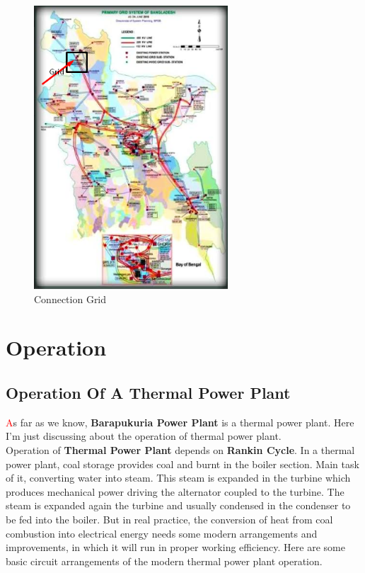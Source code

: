 \documentclass[11 pt]{article}
\begin{document}
\begin{figure}[h!]
\centering
\includegraphics[width=\textwidth-110pt, height=300pt]{Gallery/Grid.png}
\caption{Connection Grid}
\end{figure}

\pagebreak

\section{Operation}
\subsection{Operation Of A Thermal Power Plant}
{\huge\textcolor{red}{\hspace{5 mm}A}}s far as we know, \textbf{Barapukuria Power Plant} is a thermal power plant. Here I'm just discussing about the operation of thermal power plant.\\
Operation of \textbf{Thermal Power Plant} depends on \textbf{Rankin Cycle}. In a thermal power plant, coal storage provides coal and burnt in the boiler section. Main task of it, converting water into steam. This steam is expanded in the turbine which produces mechanical power driving the alternator coupled to the turbine. The steam is expanded again the turbine and usually condensed in the condenser to be fed into the boiler. But in real practice, the conversion of heat from coal combustion into electrical energy needs some modern arrangements and improvements, in which it will run in proper working efficiency. Here are some basic circuit arrangements of the modern thermal power plant operation.\\
\end{document}

